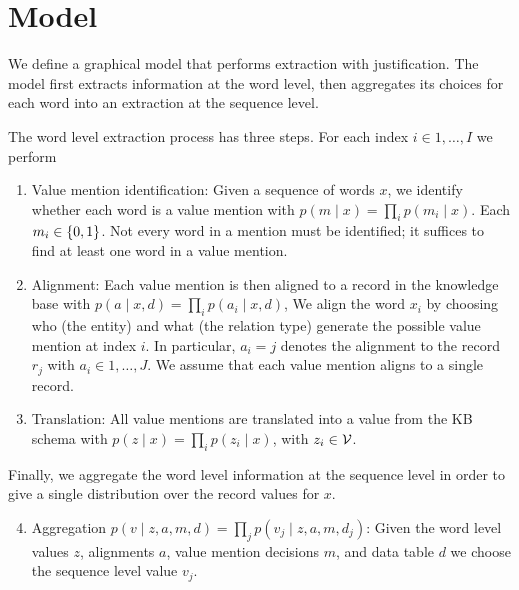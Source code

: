\documentclass[12pt]{article}
\begin{document}
\section{Model}
We define a graphical model that performs extraction with justification. 
The model first extracts information at the word level,
then aggregates its choices for each word into an extraction at the sequence level.

The word level extraction process has three steps.
For each index $i \in 1, \ldots, I$ we perform
\begin{enumerate}
\item Value mention identification: Given a sequence of words $x$,
    we identify whether each word is a value mention with
    $p(m \mid x) = \prod_i p(m_i \mid x)$.
    Each $m_i \in \left\{0,1\right\}$.
    Not every word in a mention must be identified; it suffices to find
    at least one word in a value mention.
\item Alignment: Each value mention is then aligned to a 
    record in the knowledge base with $p(a \mid x,d) = \prod_i p(a_i \mid x,d)$,
    We align the word $x_i$ by choosing who (the entity)
    and what (the relation type) generate the possible value mention at index $i$.
    In particular, $a_i = j$ denotes the alignment to the record $r_{j}$
    with $a_i \in 1, \ldots, J$.
    We assume that each value mention aligns to a single record.
\item Translation: All value mentions are translated
    into a value from the KB schema with
    $p(z \mid x) = \prod_i p(z_i \mid x)$, with $z_i \in \mathcal{V}$.
\end{enumerate}

Finally, we aggregate the word level information at the sequence level in order
to give a single distribution over the record values for $x$.
\begin{enumerate}
\setcounter{enumi}{3}
\item Aggregation $p(v \mid z,a,m,d) = \prod_j p(v_j \mid z,a,m,d_j)$:
    Given the word level values $z$, alignments $a$, value mention decisions $m$,
    and data table $d$ we choose the sequence level value $v_j$.
\end{enumerate}
\end{document}
